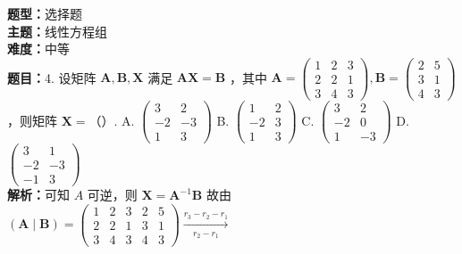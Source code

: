 \documentclass{ctexart}
\newenvironment{question}[5]{%
	\noindent\textbf{题型：}#1\\
	\textbf{主题：}#2\\
	\textbf{难度：}#3\\
	\textbf{题目：}#4\\
	\textbf{解析：}#5\\
	\vspace{1em}
}{}
\begin{document}
	
	\begin{question}
		{选择题}
		{线性方程组}
		{中等}
		{4. 设矩阵 \(\mathbf{A}, \mathbf{B}, \mathbf{X}\) 满足 \(\mathbf{A} \mathbf{X}=\mathbf{B}\) ，其中 \(\mathbf{A}=\left(\begin{array}{lll}1 & 2 & 3 \\ 2 & 2 & 1 \\ 3 & 4 & 3\end{array}\right), \mathbf{B}=\left(\begin{array}{ll}2 & 5 \\ 3 & 1 \\ 4 & 3\end{array}\right)\) ，则矩阵 \(\mathbf{X}=\)（）. 
			A. \(\left(\begin{array}{cc}3 & 2 \\ -2 & -3 \\ 1 & 3\end{array}\right)\)
			B. \(\left(\begin{array}{cc}1 & 2 \\ -2 & 3 \\ 1 & 3\end{array}\right)\)
			C. \(\left(\begin{array}{cc}3 & 2 \\ -2 & 0 \\ 1 & -3\end{array}\right)\)
			D. \(\left(\begin{array}{cc}3 & 1 \\ -2 & -3 \\ -1 & 3\end{array}\right)\)}
		{可知 \(A\) 可逆，则 \(\mathbf{X}=\mathbf{A}^{-1} \mathbf{B}\) 故由 \((\mathbf{A} \mid \mathbf{B})=\left(\begin{array}{lll|ll}1 & 2 & 3 & 2 & 5 \\ 2 & 2 & 1 & 3 & 1 \\ 3 & 4 & 3 & 4 & 3\end{array}\right) \xrightarrow[r_2-r_1]{r_3-r_2-r_1}\)
			
}
\end{question}
\end{document}
